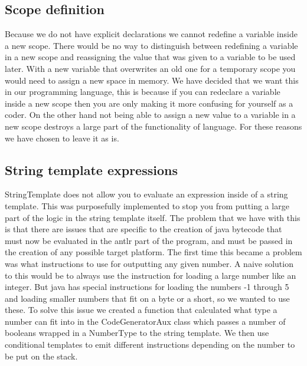 \documentclass[paper=a4, fontsize=11pt]{article}
\numberwithin{equation}{section}		%
\numberwithin{figure}{section}			%
\numberwithin{table}{section}				%
\begin{document}
\subsection{Scope definition}
Because we do not have explicit declarations we cannot redefine a variable inside a new scope. There would be no way to distinguish between redefining a variable in a new scope and reassigning the value that was given to a variable to be used later. With a new variable that overwrites an old one for a temporary scope you would need to assign a new space in memory. We have decided that we want this in our programming language, this is because if you can redeclare a variable inside a new scope then you are only making it more confusing for yourself as a coder. On the other hand not being able to assign a new value to a variable in a new scope destroys a large part of the functionality of language. For these reasons we have chosen to leave it as is.

\subsection{String template expressions}
StringTemplate does not allow you to evaluate an expression inside of a string template. This was purposefully implemented to stop you from putting a large part of the logic in the string template itself. The problem that we have with this is that there are issues that are specific to the creation of java bytecode that must now be evaluated in the antlr part of the program, and must be passed in the creation of any possible target platform. The first time this became a problem was what instructions to use for outputting any given number. A naive solution to this would be to always use the instruction for loading a large number like an integer. But java has special instructions for loading the numbers -1 through 5 and loading smaller numbers that fit on a byte or a short, so we wanted to use these. To solve this issue we created a function that calculated what type a number can fit into in the CodeGeneratorAux class which passes a number of booleans wrapped in a NumberType to the string template. We then use conditional templates to emit different instructions depending on the number to be put on the stack.

\end{document}
